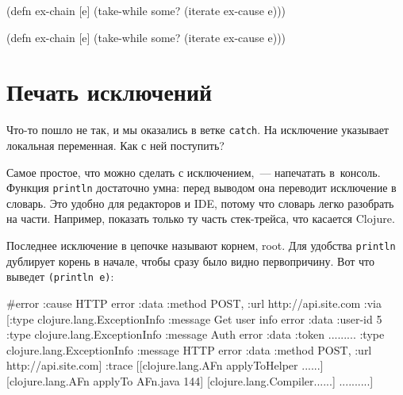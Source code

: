 \begin{english}
  \begin{clojure}
(defn ex-chain [e]
  (take-while some?
    (iterate ex-cause e)))
  \end{clojure}
\end{english}

\else

\begin{english}
  \begin{clojure}
(defn ex-chain [e]
  (take-while some? (iterate ex-cause e)))
  \end{clojure}
\end{english}

\fi

\section{Печать исключений}

Что-то пошло не так, и мы оказались в ветке \verb|catch|. На исключение
указывает локальная переменная. Как с ней поступить?

Самое простое, что можно сделать с исключением,~--- напечатать в~консоль. Функция
\verb|println| достаточно умна: перед выводом она переводит исключение в
словарь. Это удобно для редакторов и IDE, потому что словарь легко разобрать на
части. Например, показать только ту часть стек-трейса, что касается Clojure.

Последнее исключение в цепочке называют корнем, root. Для удобства
\verb|println| дублирует корень в начале, чтобы сразу было видно
первопричину. Вот что выведет \verb|(println e)|:


\ifnarrow

\begin{english}
  \begin{clojure}
#error {
 :cause HTTP error
 :data {:method POST,
        :url http://api.site.com}
 :via
 [{:type clojure.lang.ExceptionInfo
   :message Get user info error
   :data {:user-id 5}}
  {:type clojure.lang.ExceptionInfo
   :message Auth error
   :data {:token .........}}
  {:type clojure.lang.ExceptionInfo
   :message HTTP error
   :data {:method POST,
          :url http://api.site.com}}]
 :trace
 [[clojure.lang.AFn applyToHelper ......]
  [clojure.lang.AFn applyTo AFn.java 144]
  [clojure.lang.Compiler......]
  ..........]}
  \end{clojure}
\end{english}

